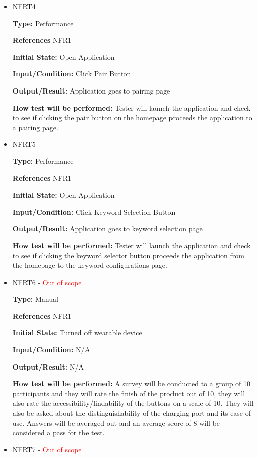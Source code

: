 \documentclass[12pt, titlepage]{article}
\begin{document}
\begin{itemize}
\item{NFRT4}

\textbf{Type:} Performance 

\textbf{References} NFR1
					
\textbf{Initial State:} Open Application
					
\textbf{Input/Condition:} Click Pair Button
					
\textbf{Output/Result:} Application goes to pairing page
					
\textbf{How test will be performed:} Tester will launch the application and check to see if clicking the pair button on the homepage proceeds the application to a pairing page.

\item{NFRT5}

\textbf{Type:} Performance

\textbf{References} NFR1
					
\textbf{Initial State:} Open Application
					
\textbf{Input/Condition:} Click Keyword Selection Button
					
\textbf{Output/Result:} Application goes to keyword selection page
					
\textbf{How test will be performed:} Tester will launch the application and check to see if clicking the keyword selector button proceeds the application from the homepage to the keyword configurations page.

\item{NFRT6 - \textcolor{red}{Out of scope}}

\textbf{Type:} Manual

\textbf{References} NFR1
					
\textbf{Initial State:} Turned off wearable device
					
\textbf{Input/Condition:} N/A
					
\textbf{Output/Result:} N/A
					
\textbf{How test will be performed:} A survey will be conducted to a group of 10 participants and they will rate the finish of the product out of 10, they will also rate the accessibility/findability of the buttons on a scale of 10. They will also be asked about the distinguishability of the charging port and its ease of use.  Answers will be averaged out and an average score of 8 will be considered a pass for the test. 

\item{NFRT7 - \textcolor{red}{Out of scope}}


\end{itemize}
\end{document}
